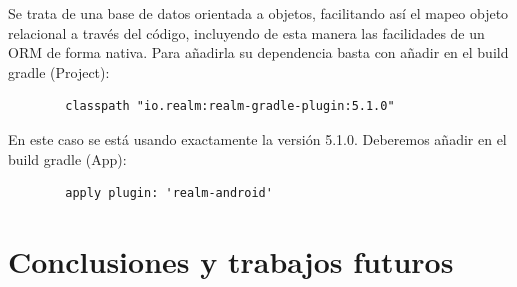 \documentclass[12pt,a4paper,oneside]{book} %
\begin{document}
Se trata de una base de datos orientada a objetos, facilitando así el mapeo objeto relacional a través del código, incluyendo de esta manera las facilidades de un ORM de forma nativa. 
\newline \newline
Para añadirla su dependencia basta con añadir en el build gradle (Project): 
\begin{verbatim}
		classpath "io.realm:realm-gradle-plugin:5.1.0"
\end{verbatim}
En este caso se está usando exactamente la versión 5.1.0. Deberemos añadir en el build gradle (App): 
\begin{verbatim}
		apply plugin: 'realm-android'

\end{verbatim}






\chapter{Conclusiones y trabajos futuros}






\pagebreak
\thispagestyle{empty}
\pagestyle{empty}



\end{document}
